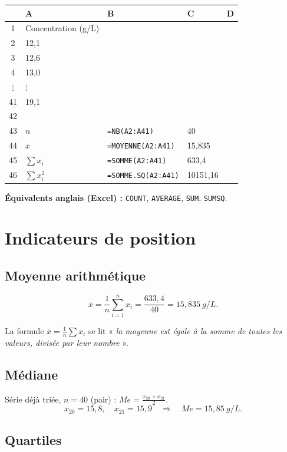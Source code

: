 \documentclass[11pt,a4paper]{article}
\newenvironment{calcsheet}[1][\footnotesize]
  {\begin{center}#1
   \begin{tabular}{|>{\columncolor{calchead}}c|l|l|l|l|}
   \hline
   \rowcolor{calchead}
   & \textbf{A} & \textbf{B} & \textbf{C} & \textbf{D} \\ \hline}
  {\end{tabular}\end{center}}
\newcommand{\fc}[1]{\textcolor{calcform}{\texttt{#1}}}
\begin{document}
\begin{calcsheet}
1 & Concentration (g/L) & & & \\ \hline
2 & 12,1 & & & \\ \hline
3 & 12,6 & & & \\ \hline
4 & 13,0 & & & \\ \hline
\(\vdots\) & \(\vdots\) & & & \\ \hline
41 & 19,1 & & & \\ \hline
42 & & & & \\ \hline
43 & \( n \)  & \fc{=NB(A2:A41)} & 40 & \\ \hline
44 & \( \bar{x} \) & \fc{=MOYENNE(A2:A41)} & 15,835 & \\ \hline
45 & \( \sum x_i \) & \fc{=SOMME(A2:A41)} & 633,4 & \\ \hline
46 & \( \sum x_i^2 \) & \fc{=SOMME.SQ(A2:A41)} & 10151,16 & \\ \hline
\end{calcsheet}

\noindent\textbf{Équivalents anglais (Excel) :}
\fc{COUNT}, \fc{AVERAGE}, \fc{SUM}, \fc{SUMSQ}.

\section{Indicateurs de position}

\subsection{Moyenne arithmétique}

\[
\bar{x} = \frac{1}{n}\sum_{i=1}^{n} x_i
= \frac{633{,}4}{40}
= \boxed{15{,}835\ \si{g/L}}.
\]

\noindent La formule \( \bar{x} = \tfrac{1}{n}\sum x_i \) se lit
« \emph{la moyenne est égale à la somme de toutes les valeurs,
divisée par leur nombre} ».

\subsection{Médiane}

Série déjà triée, \( n = 40 \) (pair) : \( Me = \frac{x_{20}+x_{21}}{2} \).
\[
x_{20} = 15{,}8,\quad x_{21} = 15{,}9
\quad\Longrightarrow\quad
Me = \boxed{15{,}85\ \si{g/L}}.
\]

\subsection{Quartiles}
\end{document}
